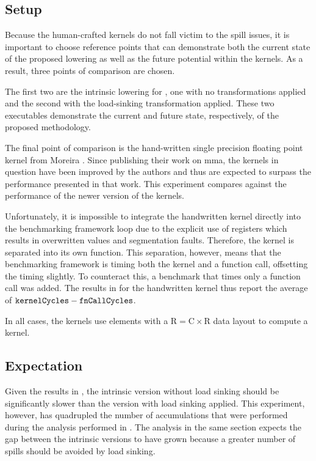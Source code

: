 \documentclass[\main/thesis.tex]{subfiles}
\begin{document}
\subsection{Setup}
Because the human-crafted kernels do not fall victim to the \gls{spill} issues, it is important to choose reference points that can demonstrate both the current state of the proposed \gls{lowering} as well as the future potential within the kernels.
As a result, three points of comparison are chosen.

The first two are the \gls{intrinsic} \gls{lowering} for , one with no transformations applied and the second with the load-sinking transformation applied.
These two executables demonstrate the current and future state, respectively, of the proposed methodology.

The final point of comparison is the hand-written single precision floating point kernel from Moreira \etal.
Since publishing their work on \gls{mma}, the kernels in question have been improved by the authors and thus are expected to surpass the performance presented in that work.
This experiment compares against the performance of the newer version of the kernels.

Unfortunately, it is impossible to integrate the handwritten kernel directly into the benchmarking framework loop due to the explicit use of registers which results in overwritten values and segmentation faults.
Therefore, the kernel is separated into its own function.
This separation, however, means that the benchmarking framework is timing both the kernel and a function call, offsetting the timing slightly.
To counteract this, a benchmark that times only a function call was added.
The results in  for the handwritten kernel thus report the average of $\textrm{\code{kernelCycles}} - \textrm{\code{fnCallCycles}}$.

In all cases, the kernels use  elements with a $\textrm{R} = \textrm{C} \times \textrm{R}$ data layout to compute a  kernel.

\subsection{Expectation}
Given the results in , the \gls{intrinsic} version without load sinking should be significantly slower than the version with load sinking applied.
This experiment, however, has quadrupled the number of accumulations that were performed during the analysis performed in .
The analysis in the same section expects the gap between the \gls{intrinsic} versions to have grown because a greater number of \glspl{spill} should be avoided by load sinking.
\end{document}
